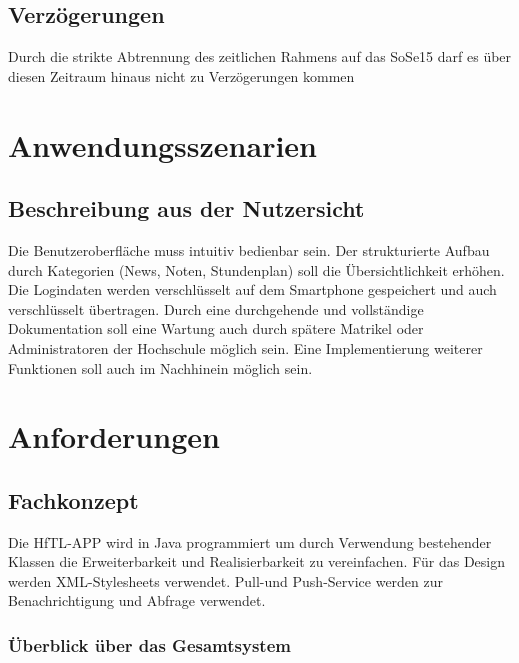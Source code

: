 \subsection{\textbf{Verzögerungen}}

Durch die strikte Abtrennung des zeitlichen Rahmens auf das \acs{SoSe15} darf es über diesen Zeitraum hinaus nicht zu Verzögerungen kommen

\section{Anwendungsszenarien}

\subsection{\textbf{Beschreibung aus der Nutzersicht}}

Die Benutzeroberfläche muss intuitiv bedienbar sein. Der strukturierte Aufbau durch Kategorien (News, Noten, Stundenplan) soll die Übersichtlichkeit erhöhen.
Die Logindaten werden verschlüsselt auf dem Smartphone gespeichert und auch verschlüsselt übertragen.
Durch eine durchgehende und vollständige Dokumentation soll eine Wartung auch durch spätere Matrikel oder Administratoren der Hochschule möglich sein.
Eine Implementierung weiterer Funktionen soll auch im Nachhinein möglich sein.

\section{Anforderungen}

\subsection{\textbf{Fachkonzept}}
Die \acs{HfTL}-APP  wird in Java programmiert um durch Verwendung bestehender Klassen die Erweiterbarkeit und Realisierbarkeit zu vereinfachen. Für das Design werden \acs{XML}-Stylesheets verwendet.
Pull-und Push-Service werden zur Benachrichtigung und Abfrage verwendet.




\subsubsection{Überblick über das Gesamtsystem}
$\;$ \\ %

